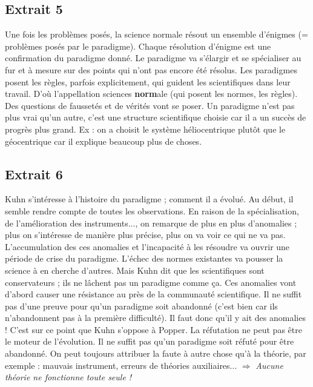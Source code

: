 \documentclass[11pt,a4paper]{article} %
\begin{document}
\subsection{Extrait 5}
Une fois les problèmes posés, la science normale résout un ensemble d'énigmes (= problèmes posés par le paradigme).
Chaque résolution d'énigme est une confirmation du paradigme donné.
Le paradigme va s'élargir et se spécialiser au fur et à mesure sur des points qui n'ont pas encore été résolus.
Les paradigmes posent les règles, parfois explicitement, qui guident les scientifiques dans leur travail.
D'où l'appellation sciences \textbf{norm}ale (qui posent les normes, les règles).
Des questions de faussetés et de vérités vont se poser.
Un paradigme n'est pas plus vrai qu'un autre, c'est une structure scientifique choisie car il a un succès de progrès plus grand.
Ex : on a choisit le système héliocentrique plutôt que le géocentrique car il explique beaucoup plus de choses.
\subsection{Extrait 6}
Kuhn s'intéresse à l'histoire du paradigme ; comment il a évolué.
Au début, il semble  rendre compte de toutes les observations.
En raison de la spécialisation, de l'amélioration des instruments..., on remarque de plus en plus d'anomalies ; plus on s'intéresse de manière plus précise, plus on va voir ce qui ne va pas.
L'accumulation des ces anomalies et l'incapacité à les résoudre va ouvrir une période de crise du paradigme.
L'échec des normes existantes va pousser la science à en cherche d'autres.
Mais Kuhn dit que les scientifiques sont conservateurs ; ils ne lâchent pas un paradigme comme ça.
Ces anomalies vont d'abord causer une résistance au près de la communauté scientifique.
Il ne suffit pas d'une preuve pour qu'un paradigme soit abandonné (c'est bien car ils n'abandonnent pas à la première difficulté).
Il faut donc qu'il y ait des anomalies ! C'est sur ce point que Kuhn s'oppose à Popper.
La réfutation ne peut pas être le moteur de l'évolution.
Il ne suffit pas qu'un paradigme soit réfuté pour être abandonné.
On peut toujours attribuer la faute à autre chose qu'à la théorie, par exemple : mauvais instrument, erreurs de théories auxiliaires... $\Rightarrow$ \emph{Aucune théorie ne fonctionne toute seule !}
\end{document}
